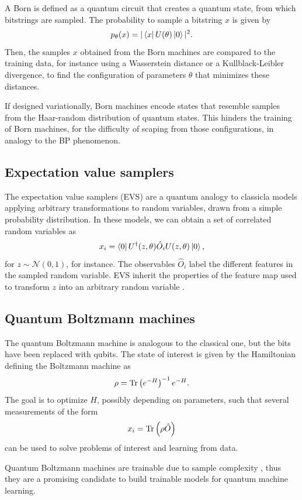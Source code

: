 \documentclass[]{report}
\begin{document}
A Born is defined as a quantum circuit that creates a quantum state, from which bitstrings are sampled. The probability to sample a bitstring $x$ is given by
\begin{equation}
p_\theta(x) = \vert \bra{x} U(\theta) \ket 0 \vert^2.
\end{equation}
Then, the samples $x$ obtained from the Born machines are compared to the training data, for instance using a Wasserstein distance or a Kullblack-Leibler divergence, to find the configuration of parameters $\theta$ that minimizes these distances. 

If designed variationally, Born machines encode states that resemble samples from the Haar-random distribution of quantum states. This hinders the training of Born machines, for the difficulty of scaping from those configurations, in analogy to the BP phenomenon. 

\subsection{Expectation value samplers}
The expectation value samplers (EVS) are a quantum analogy to classicla models applying arbitrary transformations to random variables, drawn from a simple probability distribution. In these models, we can obtain a set of correlated random variables as
\begin{equation}
x_i = \bra 0 U^\dagger(z, \theta)\hat O_i U(z,\theta)\ket 0, 
\end{equation}
for $z \sim \mathcal N(0, 1)$, for instance. The observables $\hat O_i$ label the different features in the sampled random variable. EVS inherit the properties of the feature map used to transform $z$ into an arbitrary random variable \cite{barthe2024expressivity}. 

\subsection{Quantum Boltzmann machines}
The quantum Boltzmann machine is analogous to the classical one, but the bits have been replaced with qubits. The state of interest is given by the Hamiltonian defining the Boltzmann machine as
\begin{equation}
\rho = \Tr\left( e^{-H}\right)^{-1} e^{-H}. 
\end{equation}
The goal is to optimize $H$, possibly depending on parameters, such that several measurements of the form
\begin{equation}
x_i = \Tr\left( \rho \hat O\right) 
\end{equation}
can be used to solve problems of interest and learning from data. 

Quantum Boltzmann machines are trainable due to sample complexity \cite{coopmans2024sample}, thus they are a promising candidate to build trainable models for quantum machine learning. 


\printbibliography
\end{document}
